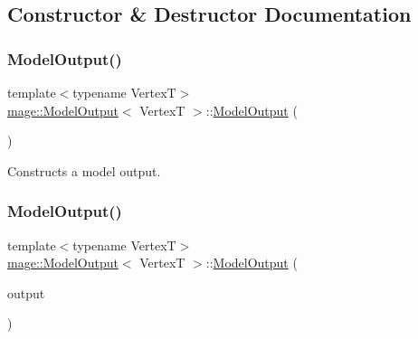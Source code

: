 \subsection{Constructor \& Destructor Documentation}
\hypertarget{structmage_1_1_model_output_a7d64b57d8207968541eb9c6da6ef0163}{}\label{structmage_1_1_model_output_a7d64b57d8207968541eb9c6da6ef0163} 
\subsubsection{\texorpdfstring{Model\+Output()}{ModelOutput()}\hspace{0.1cm}{\footnotesize\ttfamily [1/3]}}
{\footnotesize\ttfamily template$<$typename VertexT$>$ \\
\hyperlink{structmage_1_1_model_output}{mage\+::\+Model\+Output}$<$ VertexT $>$\+::\hyperlink{structmage_1_1_model_output}{Model\+Output} (\begin{DoxyParamCaption}{ }\end{DoxyParamCaption})\hspace{0.3cm}{\ttfamily [default]}}

Constructs a model output. \hypertarget{structmage_1_1_model_output_aac808e40a66f33da4ea28ebb7443623d}{}\label{structmage_1_1_model_output_aac808e40a66f33da4ea28ebb7443623d} 
\subsubsection{\texorpdfstring{Model\+Output()}{ModelOutput()}\hspace{0.1cm}{\footnotesize\ttfamily [2/3]}}
{\footnotesize\ttfamily template$<$typename VertexT$>$ \\
\hyperlink{structmage_1_1_model_output}{mage\+::\+Model\+Output}$<$ VertexT $>$\+::\hyperlink{structmage_1_1_model_output}{Model\+Output} (\begin{DoxyParamCaption}\item[{const \hyperlink{structmage_1_1_model_output}{Model\+Output}$<$ VertexT $>$ \&}]{output }\end{DoxyParamCaption})\hspace{0.3cm}{\ttfamily [delete]}}


